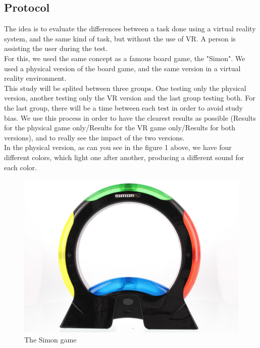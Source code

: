 \documentclass[12pt, openany, twocolumn]{article}
\begin{document}
    \subsection{Protocol}
    The idea is to evaluate the differences between a task done using a virtual reality system, and the same kind of task, but without the use of VR.
    A person is assisting the user during the test.
    \\

    For this, we used the same concept as a famous board game, the "Simon".
    We used a physical version of the board game, and the same version in a virtual reality environment.
    \\

    This study will be splited between three groups. One testing only the physical version, another testing only the VR version and the last group testing both.
    For the last group, there will be a time between each test in order to avoid study bias. We use this process in order to have the clearest results as possible (Results for the physical game only/Results for the VR game only/Results for both versions), and to really see the impact of the two versions. 
    \\

    In the physical version, as can you see in the figure 1 above, we have four different colors, which light one after another, producing a different sound for each color.
    \\
    
    \begin{figure}
    \includegraphics[scale=0.185]{simon.jpg}
    \caption{The Simon game}
    \end{figure}
\end{document}
